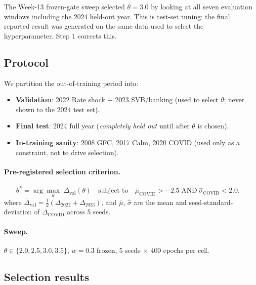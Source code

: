 \documentclass[11pt, a4paper]{article}
\begin{document}
The Week-13 frozen-gate sweep selected $\theta = 3.0$ by looking at all
seven evaluation windows including the 2024 held-out year. This is
test-set tuning: the final reported result was generated on the same data
used to select the hyperparameter. Step 1 corrects this.

\subsection{Protocol}

We partition the out-of-training period into:
\begin{itemize}
  \item \textbf{Validation}: 2022 Rate shock + 2023 SVB/banking (used
        to select $\theta$; never shown to the 2024 test set).
  \item \textbf{Final test}: 2024 full year (\emph{completely held out}
        until after $\theta$ is chosen).
  \item \textbf{In-training sanity}: 2008 GFC, 2017 Calm, 2020 COVID
        (used only as a constraint, not to drive selection).
\end{itemize}

\paragraph{Pre-registered selection criterion.}
\[
\theta^* = \arg\max_\theta \;\overline{\Delta}_{\text{val}}(\theta)
\quad\text{subject to}\quad
\bar{\mu}_\text{COVID} > -2.5
\;\text{AND}\;
\hat{\sigma}_\text{COVID} < 2.0,
\]
where $\overline{\Delta}_\text{val} = \tfrac{1}{2}(\Delta_{2022} +
\Delta_{2023})$, and $\bar{\mu}$, $\hat{\sigma}$ are the mean and
seed-standard-deviation of $\Delta_\text{COVID}$ across 5 seeds.

\paragraph{Sweep.} $\theta \in \{2.0, 2.5, 3.0, 3.5\}$,
$w = 0.3$ frozen, 5 seeds $\times$ 400 epochs per cell.

\subsection{Selection results}
\end{document}
